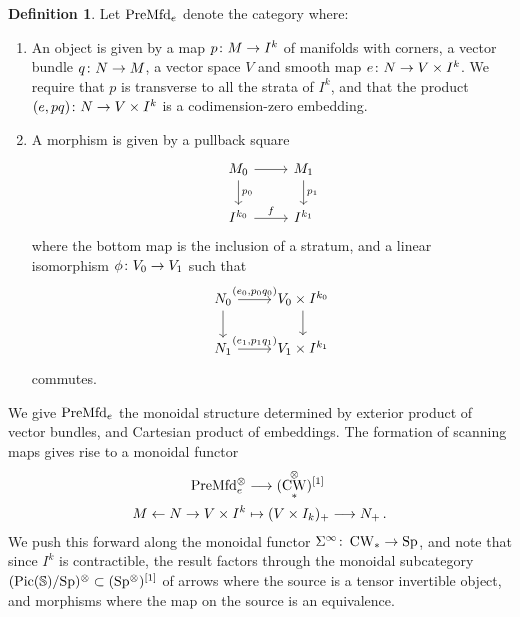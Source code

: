 \documentclass[10pt]{amsart}
\numberwithin{equation}{section}
\theoremstyle{definition}
\newtheorem{definition}[prop]{Definition}
\DeclareMathOperator{\Pic}{Pic}
\DeclareMathOperator{\CW}{CW}
\newcommand{\PreMfd}{\mathrm{PreMfd}\vphantom{d}}
\newcommand{\bS}{\mathbb{S}}
\newcommand{\Sp}{\mathrm{Sp}\vphantom{p}}
\renewcommand{\to}{\mathchoice{\longrightarrow}{\rightarrow}{}{}}
\begin{document}
\begin{definition}\label{def:Mfd_e}
	Let $\PreMfd_{e}$ denote the category where:
	\begin{enumerate}
		\item An object is given by a map $p \colon M\to I^{k}$ of manifolds with corners, a vector bundle $q\colon N\to M$, a vector space $V$ and smooth map $e\colon N\to V\times I^{k}$.
    We require that $p$ is transverse to all the strata of $I^{k}$, and that the product $(e,pq)\colon N \to V\times I^{k}$ is a codimension-zero embedding.
		\item A morphism is given by a pullback square
		\begin{equation*}
			\begin{tikzcd}
				M_{0} \arrow[r] \arrow[d, "p_{0}"]      &   M_{1}  \arrow[d,"p_{1}"] \\
				I^{k_{0}}  \arrow[r, "f"]               &   I^{k_{1}}
			\end{tikzcd}
		\end{equation*}
		where the bottom map is the inclusion of a stratum, and a linear isomorphism $\phi \colon V_0 \to V_1$ such that
		\begin{equation*}
			\begin{tikzcd}
				N_{0} \arrow[r, "{(e_{0},p_{0}q_{0})}"] \arrow[d]      &   V_{0} \times I^{k_{0}}  \arrow[d] \\
				N_{1}  \arrow[r, "{(e_{1}, p_{1}q_{1})}"]               &   V_{1} \times I^{k_{1}}
			\end{tikzcd}
		\end{equation*}
		commutes.
	\end{enumerate}

\end{definition}
We give $\PreMfd_{e}$ the monoidal structure determined by exterior product of vector bundles, and Cartesian product of embeddings.
The formation of scanning maps gives rise to a monoidal functor
\begin{align*}
	\PreMfd_{e}^{\otimes} &\to (\CW_{\ast}^{\otimes})^{[1]} \\
	M\leftarrow N \rightarrow V\times I^{k} &\mapsto (V\times I_{k})_{+} \to N_{+} \,.
\end{align*}
We push this forward along the monoidal functor $\Sigma^{\infty} \colon \CW_{\ast} \to \Sp$, and note that since $I^{k}$ is contractible, the result factors through the monoidal subcategory $(\Pic(\bS)/\Sp )^{\otimes} \subset (\Sp^{\otimes})^{[1]}$ of arrows where the source is a tensor invertible object, and morphisms where the map on the source is an equivalence.
\end{document}
